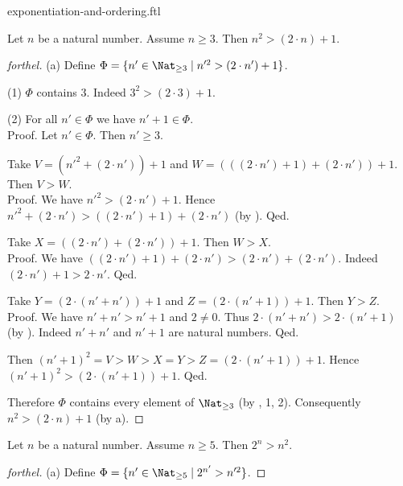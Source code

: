 \documentclass{naproche-library}
\begin{document}
\begin{smodule}{exponentiation-and-ordering.ftl}
  \begin{proposition}[forthel,id=ARITHMETIC_09_134060414337024,printid]
    Let $n$ be a natural number.
    Assume $n \geq 3$.
    Then $n^{2} > (2 \cdot n) + 1$.
  \end{proposition}
  \begin{proof}[forthel]
    (a) Define $\Phi = \{ n' \in \Nat_{\geq 3} \mid n'^{2} > (2 \cdot n') + 1 \}$.

    (1) $\Phi$ contains $3$.
    Indeed $3^{2} > (2 \cdot 3) + 1$.

    (2) For all $n' \in \Phi$ we have $n' + 1 \in \Phi$. \\
    Proof.
      Let $n' \in \Phi$.
      Then $n' \geq 3$.

      Take $V = (n'^{2} + (2 \cdot n')) + 1$ and $W = (((2 \cdot n') + 1) + (2 \cdot n')) + 1$.
      Then $V > W$. \\
      Proof.
        We have $n'^{2} > (2 \cdot n') + 1$.
        Hence $n'^{2} + (2 \cdot n') > ((2 \cdot n') + 1) + (2 \cdot n')$ (by ).
      Qed.

      Take $X = ((2 \cdot n') + (2 \cdot n')) + 1$.
      Then $W > X$. \\
      Proof.
        We have $((2 \cdot n') + 1) + (2 \cdot n') > (2 \cdot n') + (2 \cdot n')$.
        Indeed $(2 \cdot n') + 1 > 2 \cdot n'$.
      Qed.

      Take $Y = (2 \cdot (n' + n')) + 1$ and $Z = (2 \cdot (n' + 1)) + 1$.
      Then $Y > Z$. \\
      Proof.
        We have $n' + n' > n' + 1$ and $2 \neq 0$.
        Thus $2 \cdot (n' + n') > 2 \cdot (n' + 1)$ (by ).
        Indeed $n' + n'$ and $n' + 1$ are natural numbers.
      Qed.

      Then $(n' + 1)^{2} = V > W > X = Y > Z = (2 \cdot (n' + 1)) + 1$.
      Hence $(n' + 1)^{2} > (2 \cdot (n' + 1)) + 1$.
    Qed.

    Therefore $\Phi$ contains every element of $\Nat_{\geq 3}$ (by , 1, 2).
    Consequently $n^{2} > (2 \cdot n) + 1$ (by a).
  \end{proof}

  \begin{proposition}[forthel,id=ARITHMETIC_09_1097950367318016,printid]
    Let $n$ be a natural number.
    Assume $n \geq 5$.
    Then $2^{n} > n^{2}$.
  \end{proposition}
  \begin{proof}[forthel]
    (a) Define $\Phi = \{ n' \in \Nat_{\geq 5} \mid 2^{n'} > n'^{2} \}$.


\end{proof}
\end{smodule}
\end{document}
